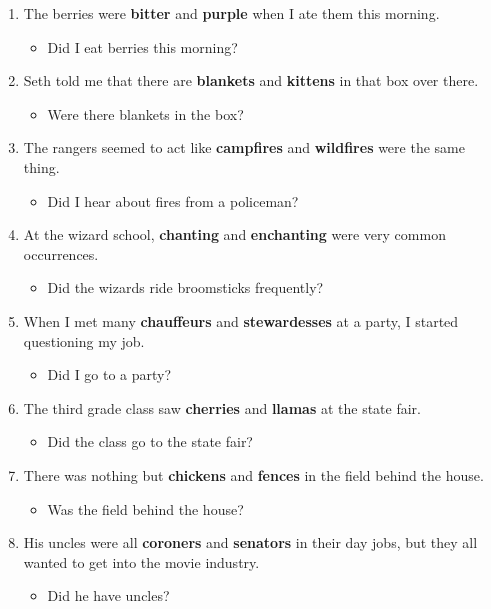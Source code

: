 \documentclass[authoryear]{elsarticle}
\begin{document}
\begin{enumerate}
\item The berries were \textbf{bitter} and \textbf{purple} when I ate them this morning.	\begin{itemize} \item Did I eat berries this morning?\end{itemize}
\item Seth told me that there are \textbf{blankets} and \textbf{kittens} in that box over there.	\begin{itemize} \item Were there blankets in the box?\end{itemize}
\item The rangers seemed to act like \textbf{campfires} and \textbf{wildfires} were the same thing.	\begin{itemize} \item Did I hear about fires from a policeman?\end{itemize}
\item At the wizard school, \textbf{chanting} and \textbf{enchanting} were very common occurrences.	\begin{itemize} \item Did the wizards ride broomsticks frequently?\end{itemize}
\item When I met many \textbf{chauffeurs} and \textbf{stewardesses} at a party, I started questioning my job.	\begin{itemize} \item Did I go to a party?\end{itemize}
\item The third grade class saw \textbf{cherries} and \textbf{llamas} at the state fair.	\begin{itemize} \item Did the class go to the state fair?\end{itemize}
\item There was nothing but \textbf{chickens} and \textbf{fences} in the field behind the house.	\begin{itemize} \item Was the field behind the house?\end{itemize}
\item His uncles were all \textbf{coroners} and \textbf{senators} in their day jobs, but they all wanted to get into the movie industry.	\begin{itemize} \item Did he have uncles?\end{itemize}

\end{enumerate}
\end{document}
